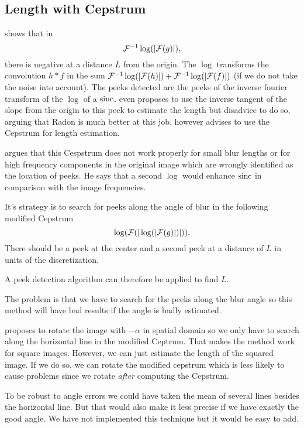 \subsection{Length with Cepstrum}
\label{subsec:Cep}
\cite{biemond1990iterative} shows that in 
\[ \mathcal{F}^{-1}\log(|\mathcal{F}(g)|), \]
there is negative at a distance $L$ from the origin.
The $\log$ transforms the convolution $h*f$ in the sum
$\mathcal{F}^{-1}\log(|\mathcal{F}(h)|) + \mathcal{F}^{-1}\log(|\mathcal{F}(f)|)$
(if we do not take the noise into account).
The peeks detected are the peeks of the inverse fourier
transform of the $\log$ of a $\operatorname{sinc}$.
\cite{krahmer2006blind} even proposes to use the inverse
tangent of the slope from the origin to this peek to
estimate the length but disadvice to do so,
arguing that Radon is much better at this job.
\cite{krahmer2006blind} however advises to use the Cepstrum
for length estimation.

\cite{Deshpande2014606} argues that this Cespstrum does
not work properly for small blur lengths or for high
frequency components in the original image which
are wrongly identified as the location of peeks.
He says that a second $\log$ would enhance $\operatorname{sinc}$ in comparison
with the image frequencies. 

It's strategy is to search for peeks
along the angle of blur in
the following modified Cepstrum
\[ \log(\mathcal{F}(|\log(|\mathcal{F}(g)|)|)). \]
There should be a peek at the center and a second peek
at a distance of $L$ in units of the discretization.

A peek detection algorithm can therefore be applied
to find $L$.

The problem is that we have to search for the peeks along
the blur angle so this method will have
bad results if the angle is badly estimated.

\cite{Deshpande2014606} proposes to rotate the image
with $-\alpha$ in spatial domain so we only have to
search along the horizontal line in the modified Ceptrum.
That makes the method work for square images.
However, we can just estimate the length of the squared image.
If we do so, we can rotate the modified cepstrum which is less
likely to cause problems since we rotate \emph{after}
computing the Cepstrum.

To be robust to angle errors we could have taken the mean of
several lines besides the horizontal line.
But that would also make it less precise if we have exactly
the good angle.
We have not implemented this technique but it would
be easy to add.


